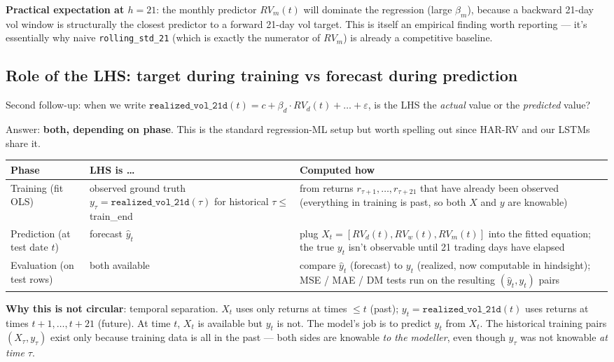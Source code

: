 \documentclass[11pt]{article}
\begin{document}
\textbf{Practical expectation at $h=21$}: the monthly predictor $RV_m(t)$ will dominate the regression (large $\beta_m$), because a backward 21-day vol window is structurally the closest predictor to a forward 21-day vol target. This is itself an empirical finding worth reporting --- it's essentially why naive \texttt{rolling\_std\_21} (which is exactly the numerator of $RV_m$) is already a competitive baseline.

\subsection*{Role of the LHS: target during training vs forecast during prediction}

Second follow-up: when we write $\texttt{realized\_vol\_21d}(t) = c + \beta_d \cdot RV_d(t) + \ldots + \varepsilon$, is the LHS the \emph{actual} value or the \emph{predicted} value?

Answer: \textbf{both, depending on phase}. This is the standard regression-ML setup but worth spelling out since HAR-RV and our LSTMs share it.

\begin{center}
\renewcommand{\arraystretch}{1.25}
\begin{tabular}{@{}p{3.2cm} p{3.8cm} p{6.2cm}@{}}
\toprule
Phase & LHS is \ldots & Computed how \\
\midrule
Training (fit OLS)        & observed ground truth $y_\tau = \texttt{realized\_vol\_21d}(\tau)$ for historical $\tau \le$ train\_end & from returns $r_{\tau+1}, \ldots, r_{\tau+21}$ that have already been observed (everything in training is past, so both $X$ and $y$ are knowable) \\
Prediction (at test date $t$) & forecast $\hat y_t$                 & plug $X_t = [RV_d(t), RV_w(t), RV_m(t)]$ into the fitted equation; the true $y_t$ isn't observable until 21 trading days have elapsed \\
Evaluation (on test rows) & both available                      & compare $\hat y_t$ (forecast) to $y_t$ (realized, now computable in hindsight); MSE / MAE / DM tests run on the resulting $(\hat y_t, y_t)$ pairs \\
\bottomrule
\end{tabular}
\end{center}

\textbf{Why this is not circular}: temporal separation. $X_t$ uses only returns at times $\le t$ (past); $y_t = \texttt{realized\_vol\_21d}(t)$ uses returns at times $t{+}1, \ldots, t{+}21$ (future). At time $t$, $X_t$ is available but $y_t$ is not. The model's job is to predict $y_t$ from $X_t$. The historical training pairs $(X_\tau, y_\tau)$ exist only because training data is all in the past --- both sides are knowable \emph{to the modeller}, even though $y_\tau$ was not knowable \emph{at time $\tau$}.
\end{document}
